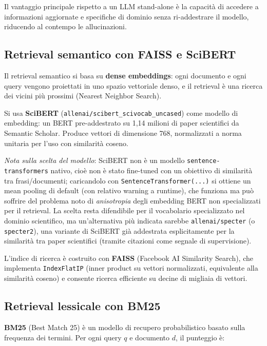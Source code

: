 \documentclass[12pt,a4paper]{article}
\begin{document}
Il vantaggio principale rispetto a un LLM stand-alone \`e la capacit\`a di accedere a informazioni aggiornate e specifiche di dominio senza ri-addestrare il modello, riducendo al contempo le allucinazioni.

\subsection{Retrieval semantico con FAISS e SciBERT}

Il retrieval semantico si basa su \textbf{dense embeddings}: ogni documento e ogni query vengono proiettati in uno spazio vettoriale denso, e il retrieval \`e una ricerca dei vicini pi\`u prossimi (Nearest Neighbor Search).

Si usa \textbf{SciBERT} (\texttt{allenai/scibert\_scivocab\_uncased}) come modello di embedding: un BERT pre-addestrato su 1,14 milioni di paper scientifici da Semantic Scholar. Produce vettori di dimensione 768, normalizzati a norma unitaria per l'uso con similarit\`a coseno.

\textit{Nota sulla scelta del modello}: SciBERT non \`e un modello \texttt{sentence-transformers} nativo, cio\`e non \`e stato fine-tuned con un obiettivo di similarit\`a tra frasi/documenti; caricandolo con \texttt{SentenceTransformer(...)} si ottiene un mean pooling di default (con relativo warning a runtime), che funziona ma pu\`o soffrire del problema noto di \textit{anisotropia} degli embedding BERT non specializzati per il retrieval. La scelta resta difendibile per il vocabolario specializzato nel dominio scientifico, ma un'alternativa pi\`u indicata sarebbe \texttt{allenai/specter} (o \texttt{specter2}), una variante di SciBERT gi\`a addestrata esplicitamente per la similarit\`a tra paper scientifici (tramite citazioni come segnale di supervisione).

L'indice di ricerca \`e costruito con \textbf{FAISS} (Facebook AI Similarity Search), che implementa \texttt{IndexFlatIP} (inner product su vettori normalizzati, equivalente alla similarit\`a coseno) e consente ricerca efficiente su decine di migliaia di vettori.

\subsection{Retrieval lessicale con BM25}

\textbf{BM25} (Best Match 25) \`e un modello di recupero probabilistico basato sulla frequenza dei termini. Per ogni query $q$ e documento $d$, il punteggio \`e:
\end{document}
